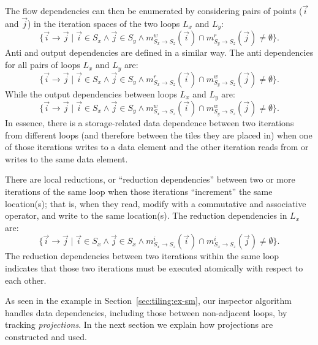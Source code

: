 The flow dependencies can then be enumerated by considering pairs of points ($\vec{i}$ and $\vec{j}$) in the iteration spaces of the two loops $L_x$ and $L_y$:
\[
	\{ \vec{i} \rightarrow \vec{j} \; | \; \vec{i} \in S_x \wedge \vec{j} \in S_y \wedge 
	m_{S_x\rightarrow S_z}^{w}(\vec{i}) \cap m_{S_y \rightarrow S_z}^{r}(\vec{j}) \ne \emptyset \}.
\]
Anti and output dependencies are defined in a similar way. The anti dependencies for all pairs of loops $L_x$ and $L_y$ are:
\[
	\{ \vec{i} \rightarrow \vec{j} \; | \; \vec{i} \in S_x \wedge \vec{j} \in S_y \wedge 
	m_{S_x\rightarrow S_z}^{r}(\vec{i}) \cap m_{S_y \rightarrow S_z}^{w}(\vec{j}) \ne \emptyset \}.
\]
While the output dependencies between loops $L_x$ and $L_y$ are:
\[
	\{ \vec{i} \rightarrow \vec{j} \; | \; \vec{i} \in S_x \wedge \vec{j} \in S_y \wedge 
	m_{S_x\rightarrow S_z}^{w}(\vec{i}) \cap m_{S_y \rightarrow S_z}^{w}(\vec{j}) \ne \emptyset \}.
\]
In essence, there is a storage-related data dependence between two iterations from different loops (and therefore between the tiles they are placed in) when one of those iterations writes to a data element and the other iteration reads from or writes to the same data element.

There are local reductions, or ``reduction dependencies'' between two or more iterations of the same loop when those iterations ``increment'' the same location(s); that is, when they read, modify with a commutative and associative operator, and write to the same location(s). The reduction dependencies in $L_x$ are:
\[
	\{ \vec{i} \rightarrow \vec{j} \; | \; \vec{i} \in S_x \wedge \vec{j} \in S_x \wedge m_{S_x\rightarrow S_z}^{i}(\vec{i}) \cap m_{S_x \rightarrow S_z}^{i}(\vec{j}) \ne \emptyset \}.
\]
The reduction dependencies between two iterations within the same loop indicates that those two iterations must be executed atomically with respect to each other.

As seen in the example in Section~\ref{sec:tiling:ex-sm}, our inspector algorithm handles data dependencies, including those between non-adjacent loops, by tracking \textit{projections}. In the next section we explain how projections are constructed and used.



